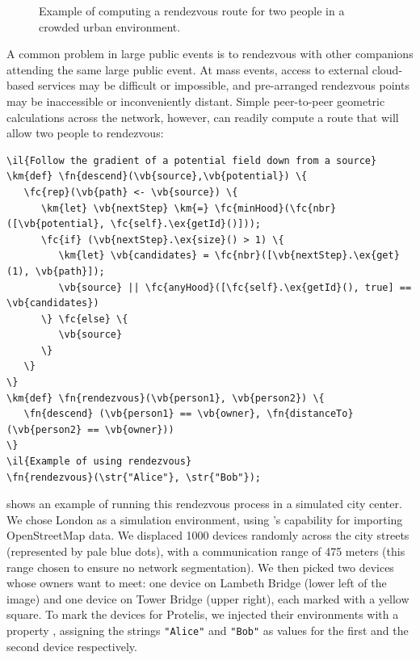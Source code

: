 \documentclass[12pt,a4paper,twoside,openright]{book}
\begin{document}
\begin{figure}
{\label{img:protelis-rendezvous-middle2}}
%
% 
\caption[Rendezvous route for two people in a crowded urban environment]{Example of computing a rendezvous route for two people in a crowded urban environment.}
\label{img:protelis-rendezvous}
\end{figure}

A common problem in large public events is to rendezvous with other companions attending the same large public event. At mass events, access to external cloud-based services may be difficult or impossible, and pre-arranged rendezvous points may be inaccessible or inconveniently distant.
%
Simple peer-to-peer geometric calculations across the network, however, can readily compute a route that will allow two people to rendezvous:
\begin{Verbatim}[samepage=true, frame=single, commandchars=\\\{\}]
\il{Follow the gradient of a potential field down from a source}
\km{def} \fn{descend}(\vb{source},\vb{potential}) \{
   \fc{rep}(\vb{path} <- \vb{source}) \{
      \km{let} \vb{nextStep} \km{=} \fc{minHood}(\fc{nbr}([\vb{potential}, \fc{self}.\ex{getId}()]));
      \fc{if} (\vb{nextStep}.\ex{size}() > 1) \{
         \km{let} \vb{candidates} = \fc{nbr}([\vb{nextStep}.\ex{get}(1), \vb{path}]);
         \vb{source} || \fc{anyHood}([\fc{self}.\ex{getId}(), true] == \vb{candidates})
      \} \fc{else} \{
         \vb{source}
      \}
   \}
\}
\km{def} \fn{rendezvous}(\vb{person1}, \vb{person2}) \{
   \fn{descend} (\vb{person1} == \vb{owner}, \fn{distanceTo}(\vb{person2} == \vb{owner}))
\}
\il{Example of using rendezvous}
\fn{rendezvous}(\str{"Alice"}, \str{"Bob"});
\end{Verbatim}

 shows an example of running this rendezvous process in a simulated city center.
%
We chose London as a simulation environment, using \alchemist{}'s capability for importing OpenStreetMap data.
%
We displaced 1000 devices randomly across the city streets (represented by pale blue dots), with a communication range of 475 meters (this range chosen to ensure no network segmentation).
%
We then picked two devices whose owners want to meet: one device on Lambeth Bridge (lower left of the image) and one device on Tower Bridge (upper right), each marked with a yellow square.
%
To mark the devices for Protelis, we injected their environments with a property \texttt{}, assigning the strings \texttt{"Alice"} and \texttt{"Bob"} as values for the first and the second device respectively.
\end{document}
